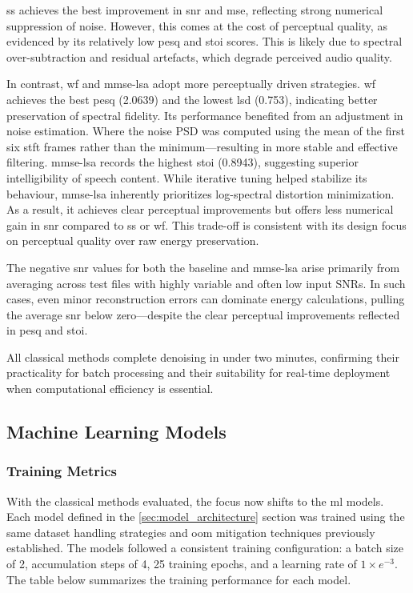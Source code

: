 \gls{ss} achieves the best improvement in \gls{snr} and \gls{mse}, reflecting strong numerical suppression of noise. However, this comes at the cost of perceptual quality, as evidenced by its relatively low \gls{pesq} and \gls{stoi} scores. This is likely due to spectral over-subtraction and residual artefacts, which degrade perceived audio quality.

In contrast, \gls{wf} and \gls{mmse-lsa} adopt more perceptually driven strategies. \gls{wf} achieves the best \gls{pesq} (2.0639) and the lowest \gls{lsd} (0.753), indicating better preservation of spectral fidelity. Its performance benefited from an adjustment in noise estimation. Where the noise PSD was computed using the mean of the first six \gls{stft} frames rather than the minimum—resulting in more stable and effective filtering. \gls{mmse-lsa} records the highest \gls{stoi} (0.8943), suggesting superior intelligibility of speech content. While iterative tuning helped stabilize its behaviour, \gls{mmse-lsa} inherently prioritizes log-spectral distortion minimization. As a result, it achieves clear perceptual improvements but offers less numerical gain in \gls{snr} compared to \gls{ss} or \gls{wf}. This trade-off is consistent with its design focus on perceptual quality over raw energy preservation.

The negative \gls{snr} values for both the baseline and \gls{mmse-lsa} arise primarily from averaging across test files with highly variable and often low input SNRs. In such cases, even minor reconstruction errors can dominate energy calculations, pulling the average \gls{snr} below zero—despite the clear perceptual improvements reflected in \gls{pesq} and \gls{stoi}.

All classical methods complete denoising in under two minutes, confirming their practicality for batch processing and their suitability for real-time deployment when computational efficiency is essential.

\subsection{Machine Learning Models}
\label{sec:ml_models}

\subsubsection{Training Metrics}
\label{sec:training_metrics}

With the classical methods evaluated, the focus now shifts to the \gls{ml} models. Each model defined in the \ref{sec:model_architecture} section was trained using the same dataset handling strategies and \gls{oom} mitigation techniques previously established. The models followed a consistent training configuration: a batch size of 2, accumulation steps of 4, 25 training epochs, and a learning rate of $1 \times e^{-3}$. The table below summarizes the training performance for each model.

